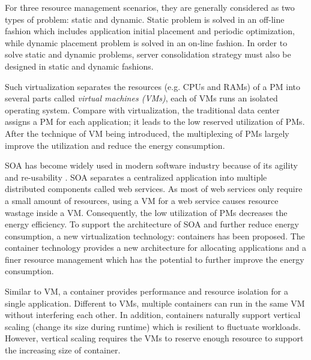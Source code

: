  For three resource management scenarios, they are generally considered as two types of problem: static and dynamic. Static problem is solved in an off-line fashion which includes application initial placement and periodic optimization, while dynamic placement problem is solved in an on-line fashion. In order to solve static and dynamic problems, server consolidation strategy must also be designed in static and dynamic fashions. 


 Such virtualization separates the resources (e.g. CPUs and RAMs) of a PM into several parts called \emph{virtual machines (VMs)}, each of VMs runs an isolated operating system. Compare with virtualization, the traditional data center assigns a PM for each application; it leads to the low reserved utilization of PMs. After the technique of VM being introduced, the multiplexing of PMs largely improve the utilization and reduce the energy consumption. 

 SOA has become widely used in modern software industry because of its agility and re-usability \cite{Sprott:2004wt}. SOA separates a centralized application into multiple distributed components called web services. As most of web services only require a small amount of resources,  using a VM for a web service causes resource wastage inside a VM. Consequently, the low utilization of PMs decreases the energy efficiency. To support the architecture of SOA and further reduce energy consumption, a new virtualization technology: containers \cite{Felter:2015ki, Soltesz:2007cu} has been proposed. The container technology provides a new architecture for allocating applications and a finer resource management which has the potential to further improve the energy consumption.

 Similar to VM, a container provides performance and resource isolation for a single application. Different to VMs, multiple containers can run in the same VM without interfering each other. In addition, containers naturally support vertical scaling (change its size during runtime)\cite{Vaquero:2011gb} which is resilient to fluctuate workloads. However, vertical scaling requires the VMs to reserve enough resource to support the increasing size of container.

